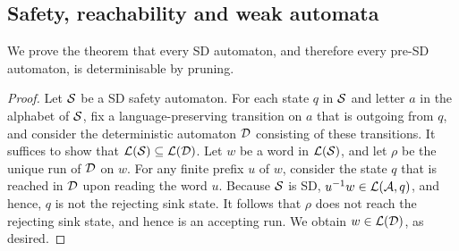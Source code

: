 \subsection{Safety, reachability and weak automata}\label{app:succandcompsafety}\label{app:succandcompWeak}
We prove the theorem that every SD automaton, and therefore every pre-SD automaton, is determinisable by pruning.
\SDsafetyisDBP*
\begin{proof}
    Let $\mathcal{S}$ be a SD safety automaton. For each state $q$ in $\mathcal{S}$ and letter $a$ in the alphabet of $\mathcal{S}$, fix a language-preserving transition on $a$ that is outgoing from $q$, and consider the deterministic automaton $\mathcal{D}$ consisting of these transitions. It suffices to show that $\mathcal{L}(\mathcal{S}) \subseteq \mathcal{L}(\mathcal{D})$. Let $w$ be a word in $\mathcal{L}(\mathcal{S})$, and let $\rho$ be the unique run of $\mathcal{D}$ on $w$. For any finite prefix $u$ of $w$, consider the state $q$ that is reached in $\mathcal{D}$ upon reading the word $u$. Because $\mathcal{S}$ is SD, $u^{-1}w\in \mathcal{L}(\mathcal{A},q)$, and hence, $q$ is not the rejecting sink state. It follows that $\rho$ does not reach the rejecting sink state, and hence is an accepting run. We obtain $w\in \mathcal{L}(\mathcal{D})$, as desired.
\end{proof}

